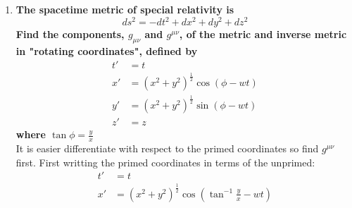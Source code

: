 \documentclass[9pt]{report}
\begin{document}
\begin{enumerate}
\begin{enumerate}
\[\[\begin{align*}
    &=
     -r \sin\theta \cos\theta \frac{\tan\phi \sec^2\phi}{(1+\tan^2\phi)^2}
    + r \cos\theta\sin\theta \frac{\tan\phi \sec^2\phi}{(1+\tan^2\phi)^2}\\
    &= 0
    \end{align*}
  \]
  \[
    \begin{align*}
      g_{\theta,\phi} = g_{\phi, \theta} &=
    g_{x,x}\frac{\partial x}{\partial \theta} \frac{\partial x}{\partial \phi}+
    g_{y,y}\frac{\partial y}{\partial \theta} \frac{\partial y}{\partial \phi}+
    g_{z,z}\frac{\partial z}{\partial \theta} \frac{\partial z}{\partial \phi}\\
    &=-r\frac{\cos\theta}{\sqrt{1+\tan^2\phi}}\Bigg(-r\sin\theta\frac{\tan\phi\sec^2\phi}{(1+\tan^2\phi)^\frac{3}{2}}\Bigg)
    -r\tan\phi\frac{\cos\theta}{\sqrt{1+\tan^2\phi}}\Bigg(r \sin\theta \frac{\sec^2\phi}{(1+\tan^2\phi)^\frac{3}{2}} \Bigg)\\
  &=r^2\sin\theta\cos\theta\frac{\tan\phi\sec^2\phi}{(1+\tan^2\phi)^2}
  -r^2 \sin \theta \cos\theta\frac{\tan\phi\sec^2\phi}{(1+\tan^2\phi)^2}\\
  &= 0
    \end{align*}
  \]
  Therefore the metric components in spherical polar coordinates are:
  \[
    g_{\mu, \nu} =
    \begin{bmatrix}
      1 && 0 && 0 \\
      0 && r^2 && 0 \\
      0 && 0 && r^2\sin^2\theta
    \end{bmatrix}
  \]
  \item
  \textbf{The spacetime metric of special relativity is}
  \[
  ds^2=-dt^2+dx^2+dy^2+dz^2
  \]
  \textbf{Find the components, $g_{\mu\nu}$ and $g^{\mu\nu}$, of the metric and
  inverse metric in "rotating coordinates", defined by}
  \[
    \begin{align*}
      t'&=t\\
      x'&=(x^2+y^2)^\frac{1}{2}\cos(\phi-wt)\\
      y'&=(x^2+y^2)^\frac{1}{2}\sin(\phi-wt)\\
      z'&=z
    \end{align*}
  \]
  \textbf{where $\tan\phi = \frac{y}{x}$}\\
  It is easier differentiate with respect to the primed coordinates so find
  $g^{\mu\nu}$ first. First writting the primed coordinates in terms of the
  unprimed:
  \[
  \begin{align*}
    t' &= t\\
    x' &= (x^2+y^2)^\frac{1}{2}\cos(\tan^{-1}\frac{y}{x} - wt)\\

\end{align*}\]\]
\end{enumerate}
\end{enumerate}
\end{document}
